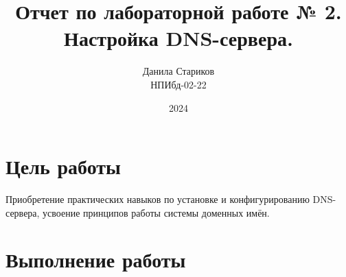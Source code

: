 

\title{Отчет по лабораторной работе № 2. \\ Настройка DNS-сервера.}
\author{Данила Стариков \\ НПИбд-02-22}
\date{2024}



\maketitle
\newpage

\tableofcontents

\newpage
\section{Цель работы}
Приобретение практических навыков по установке и конфигурированию DNS-сервера, усвоение принципов работы системы доменных имён.

\newpage
\section{Выполнение работы}
